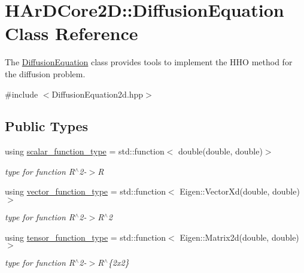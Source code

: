\hypertarget{classHArDCore2D_1_1DiffusionEquation}{}\section{H\+Ar\+D\+Core2D\+:\+:Diffusion\+Equation Class Reference}
\label{classHArDCore2D_1_1DiffusionEquation}


The \hyperlink{classHArDCore2D_1_1DiffusionEquation}{Diffusion\+Equation} class provides tools to implement the H\+HO method for the diffusion problem.  




{\ttfamily \#include $<$Diffusion\+Equation2d.\+hpp$>$}

\subsection*{Public Types}
\begin{DoxyCompactItemize}
\item 
\mbox{\label{classHArDCore2D_1_1DiffusionEquation_ae1c7c45bf1c9402b11d431716f5e1936}} 
using \hyperlink{classHArDCore2D_1_1DiffusionEquation_ae1c7c45bf1c9402b11d431716f5e1936}{scalar\+\_\+function\+\_\+type} = std\+::function$<$ double(double, double)$>$
\begin{DoxyCompactList}\small\item\em type for function R$^\wedge$2-\/$>$R \end{DoxyCompactList}\item 
\mbox{\label{classHArDCore2D_1_1DiffusionEquation_a8fb1165da7a58b15bc4ed9a86829290a}} 
using \hyperlink{classHArDCore2D_1_1DiffusionEquation_a8fb1165da7a58b15bc4ed9a86829290a}{vector\+\_\+function\+\_\+type} = std\+::function$<$ Eigen\+::\+Vector\+Xd(double, double)$>$
\begin{DoxyCompactList}\small\item\em type for function R$^\wedge$2-\/$>$R$^\wedge$2 \end{DoxyCompactList}\item 
\mbox{\label{classHArDCore2D_1_1DiffusionEquation_acb28d76dbd9b3c07f20a996f74915b76}} 
using \hyperlink{classHArDCore2D_1_1DiffusionEquation_acb28d76dbd9b3c07f20a996f74915b76}{tensor\+\_\+function\+\_\+type} = std\+::function$<$ Eigen\+::\+Matrix2d(double, double)$>$
\begin{DoxyCompactList}\small\item\em type for function R$^\wedge$2-\/$>$R$^\wedge$\{2x2\} \end{DoxyCompactList}\end{DoxyCompactItemize}
